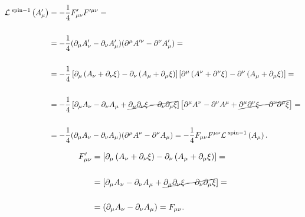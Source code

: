 \begin{equation}
\begin{split}
	\mathcal{L}^{\;\text{spin}-1} \left(A'_{\mu}\right) &= 
	-\frac{1}{4}F'_{\mu\nu}F'^{\mu\nu} =  \\ \\
	 &= -\frac{1}{4}(\partial_{\mu}A'_{\nu} - \partial_{\nu}A'_{\mu})(\partial^{\mu}A'^{\nu} - \partial^{\nu}A'_{\mu}) = \\ \\
	 &= -\frac{1}{4}\left[\partial_{\mu}\left(A_{\nu} + \partial_{\nu}\xi\right) - \partial_{\nu}\left(A_{\mu} + \partial_{\mu}\xi\right)\right] \left[\partial^{\mu}\left(A^{\nu} + \partial^{\nu}\xi\right) - \partial^{\nu}\left(A_{\mu} + \partial_{\mu}\xi \right)\right] = \\ \\
	 &= -\frac{1}{4}\left[ \partial_{\mu}A_{\nu} - \partial_{\nu}A_{\mu} + \cancel{\partial_{\mu}\partial_{\nu}\xi - \partial_{\nu}\partial_{\mu}\xi}  \right] \left[ \partial^{\mu}A^{\nu} - \partial^{\nu}A^{\mu} + \cancel{\partial^{\mu}\partial^{\nu}\xi - \partial^{\nu}\partial^{\mu}\xi}  \right] = \\ \\
	&=  -\frac{1}{4}(\partial_{\mu}A_{\nu} - \partial_{\nu}A_{\mu})(\partial^{\mu}A^{\nu} - \partial^{\nu}A_{\mu})  = 
	 -\frac{1}{4}F_{\mu\nu}F^{\mu\nu} \mathcal{L}^{\;\text{spin}-1} \left(A_{\mu}\right).
\end{split}
\end{equation}


\begin{equation} \label{eq:Appendix1:InvarianzaF}
\begin{split}
	F'_{\mu\nu} &= 
	\left[\partial_{\mu}\left(A_{\nu} + \partial_{\nu}\xi\right) - \partial_{\nu}\left(A_{\mu} + \partial_{\mu}\xi\right)\right] = \\ \\
	&= \left[ \partial_{\mu}A_{\nu} - \partial_{\nu}A_{\mu} + \cancel{\partial_{\mu}\partial_{\nu}\xi - \partial_{\nu}\partial_{\mu}\xi}  \right] = \\ \\
	&= (\partial_{\mu}A_{\nu} - \partial_{\nu}A_{\mu}) = F_{\mu\nu}.
\end{split}
\end{equation}

